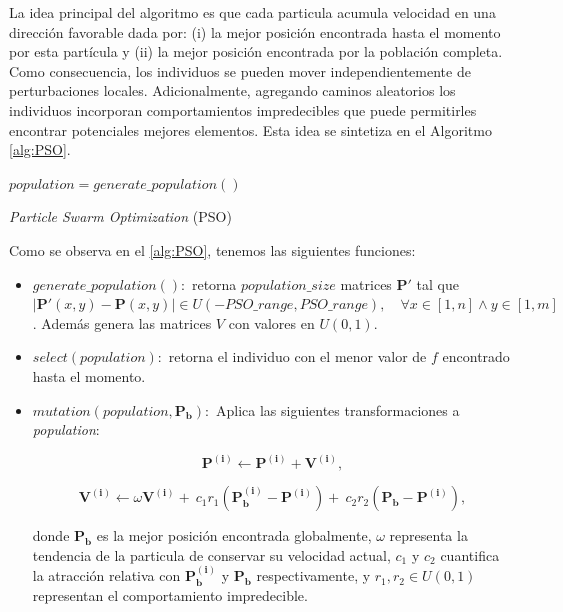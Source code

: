 La idea principal del algoritmo es que cada particula acumula 
velocidad en una dirección favorable dada por: 
(i) la mejor posición encontrada hasta el momento por esta partícula y 
(ii) la mejor posición encontrada por la población completa.
Como consecuencia, los individuos se pueden mover independientemente de
perturbaciones locales.
Adicionalmente, agregando caminos aleatorios los individuos incorporan
comportamientos impredecibles que puede permitirles encontrar potenciales
mejores elementos. Esta idea se sintetiza en el Algoritmo \ref{alg:PSO}.

\begin{algorithm}
{}
$population = generate\_population()$ \\
\caption{\emph{Particle Swarm Optimization} (PSO)}
\label{alg:PSO}
\end{algorithm}

Como se observa en el \autoref{alg:PSO}, tenemos las siguientes funciones:

\begin{itemize}

    \item $generate\_population():$ 
      retorna $population\_size$ matrices 
      $\boldsymbol{P'}$ tal que 
      $|\boldsymbol{P'}(x, y) - \boldsymbol{P}(x, y)| \in U(-PSO\_range, PSO\_range), \quad \forall x \in [1, n]
      \land y \in [1, m]$. Además genera las matrices $V$ con valores en $U(0, 1)$.

\item $select(population):$ retorna el individuo con el menor valor de $f$ encontrado hasta el momento.

\item $mutation(population, \boldsymbol{P_b}):$ Aplica las siguientes transformaciones a \emph{population}: 
    
  \begin{equation}
    \boldsymbol{P^{(i)}} \gets \boldsymbol{P^{(i)}} + \boldsymbol{V^{(i)}},
  \label{pso-pos}
  \end{equation}

  \begin{equation}
    \boldsymbol{V^{(i)}} \gets \omega \boldsymbol{V^{(i)}} + \
                          c_1 r_1 \left(\boldsymbol{P_{b}^{(i)}} - \boldsymbol{P^{(i)}} \right) + \
                          c_2 r_2 \left(\boldsymbol{P_{b}} - \boldsymbol{P^{(i)}} \right),
  \label{pso-speed}
  \end{equation}
    

  donde $\boldsymbol{P_{b}}$  es la mejor posición encontrada globalmente, 
  $\omega$ representa la tendencia de la particula de conservar su velocidad actual,
  $c_1$ y $c_2$ cuantifica la atracción relativa con $\boldsymbol{P_{b}^{(i)}}$ y 
  $\boldsymbol{P_{b}}$ respectivamente, 
  y $r_1, r_2 \in U(0, 1)$ representan el comportamiento impredecible.

\end{itemize}

